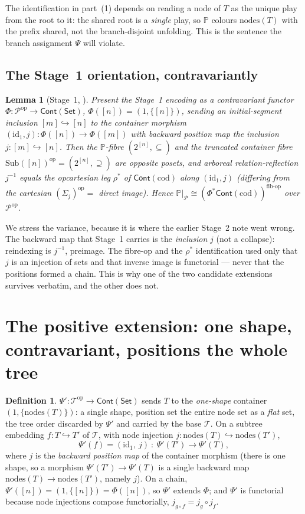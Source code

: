 \documentclass[11pt]{article}
\newtheorem{lemma}[theorem]{Lemma}
\theoremstyle{definition}
\newtheorem{definition}[theorem]{Definition}
\newcommand{\Set}{\mathsf{Set}}
\newcommand{\Cont}{\mathsf{Cont}}
\newcommand{\Sub}{\mathrm{Sub}}
\newcommand{\cod}{\mathrm{cod}}
\newcommand{\nodes}{\mathrm{nodes}}
\newcommand{\id}{\mathrm{id}}
\newcommand{\op}{\mathrm{op}}
\newcommand{\Tree}{\mathcal{T}}
\newcommand{\Path}{\mathcal{P}}
\newcommand{\Pfib}{\mathbb{P}}
\newcommand{\inpr}{\hookrightarrow}
\newcommand{\Psip}{\Psi'}
\begin{document}
The identification in part~(1) depends on reading a node of $T$ as the unique play from the root to
it: the shared root is a \emph{single} play, so $\Pfib$ colours $\nodes(T)$ with the prefix shared,
not the branch-disjoint unfolding. This is the sentence the branch assignment $\Psi$ will violate.

\subsection{The Stage~1 orientation, contravariantly}

\begin{lemma}[Stage~1, \cite{macbeth-stage1}]\label{lem:stage1}
Present the Stage~1 encoding as a \emph{contravariant} functor $\Phi\colon\Path^\op\to\Cont(\Set)$,
$\Phi([n])=(1,\{[n]\})$, sending an initial-segment inclusion $[m]\inpr[n]$ to the container
morphism $(\id_1,j)\colon\Phi([n])\to\Phi([m])$ with backward position map the inclusion
$j\colon[m]\inpr[n]$. Then the $\Pfib$-fibre $(2^{[n]},\subseteq)$ and the truncated container fibre
$\Sub([n])^\op=(2^{[n]},\supseteq)$ are \emph{opposite} posets, and arboreal relation-reflection
$j^{-1}$ equals the \emph{opcartesian} leg $\rho^*$ of $\Cont(\cod)$ along $(\id_1,j)$ (differing
from the cartesian $(\Sigma_j)^\op=$ direct image). Hence
$\Pfib|_\Path\cong(\Phi^*\Cont(\cod))^{\mathrm{fib\text{-}op}}$ over $\Path^\op$.
\end{lemma}

We stress the variance, because it is where the earlier Stage~2 note went wrong. The backward map
that Stage~1 carries is the \emph{inclusion} $j$ (not a collapse): reindexing is $j^{-1}$, preimage.
The fibre-op and the $\rho^*$ identification used only that $j$ is an injection of sets and that
inverse image is functorial --- never that the positions formed a chain. This is why one of the two
candidate extensions survives verbatim, and the other does not.

\section{The positive extension: one shape, contravariant, positions the whole tree}%
\label{sec:positive}

\begin{definition}\label{def:psiprime}
$\Psip\colon\Tree^\op\to\Cont(\Set)$ sends $T$ to the \emph{one-shape} container
$(1,\{\nodes(T)\})$: a single shape, position set the entire node set as a \emph{flat} set, the tree
order discarded by $\Psip$ and carried by the base $\Tree$. On a subtree embedding
$f\colon T\inpr T'$ of $\Tree$, with node injection $j\colon\nodes(T)\inpr\nodes(T')$,
\[
\Psip(f)=(\id_1,\ j)\ \colon\ \Psip(T')\longrightarrow\Psip(T),
\]
where $j$ is the \emph{backward position map} of the container morphism (there is one shape, so a
morphism $\Psip(T')\to\Psip(T)$ is a single backward map $\nodes(T)\to\nodes(T')$, namely $j$). On a
chain, $\Psip([n])=(1,\{[n]\})=\Phi([n])$, so $\Psip$ extends $\Phi$; and $\Psip$ is functorial
because node injections compose functorially, $j_{g\circ f}=j_g\circ j_f$.
\end{definition}
\end{document}
